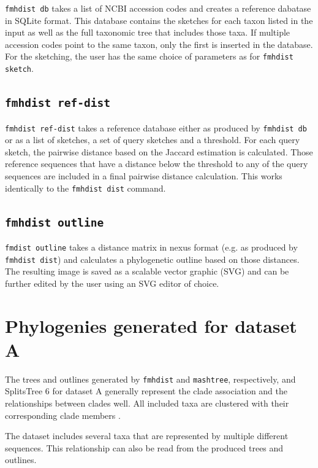 \texttt{fmhdist db} takes a list of NCBI accession codes and creates a reference
dabatase in SQLite format. This database contains the sketches for each taxon
listed in the input as well as the full taxonomic tree that includes those taxa.
If multiple accession codes point to the same taxon, only the first is inserted
in the database. For the sketching, the user has the same choice of parameters
as for \texttt{fmhdist sketch}.

\subsection*{\texttt{fmhdist ref-dist}}

\texttt{fmhdist ref-dist} takes a reference database either as produced by
\texttt{fmhdist db} or as a list of sketches, a set of query sketches and a
threshold. For each query sketch, the pairwise distance based on the Jaccard
estimation is calculated. Those reference sequences that have a distance below
the threshold to any of the query sequences are included in a final pairwise
distance calculation. This works identically to the \texttt{fmhdist dist}
command.

\subsection*{\texttt{fmhdist outline}}

\texttt{fmdist outline} takes a distance matrix in nexus format (e.g. as
produced by \texttt{fmhdist dist}) and calculates a phylogenetic outline based
on those distances. The resulting image is saved as a scalable vector graphic
(SVG) and can be further edited by the user using an SVG editor of choice.

\section{Phylogenies generated for dataset A} 
The trees and outlines generated by \texttt{fmhdist} and \texttt{mashtree},
respectively, and SplitsTree 6
\cite{husonApplicationPhylogeneticNetworks2006,bagciMicrobialPhylogeneticContext2021}
for dataset A generally represent the clade association and the relationships
between clades well. All included taxa are clustered with their corresponding
clade members
\cite{abadPhytophthoraTaxonomicPhylogenetic2023a,yangExpandedPhylogenyGenus2017}.

The dataset includes several taxa that are represented by multiple different
sequences. This relationship can also be read from the produced trees and
outlines.

